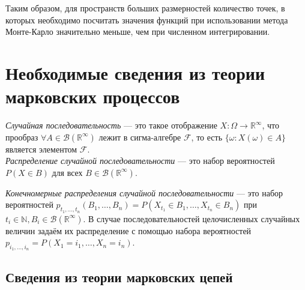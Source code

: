 \documentclass[14pt,a4paper]{article}
\begin{document}
Таким образом, для пространств больших размерностей количество точек, в которых необходимо посчитать значения функций при использовании метода Монте-Карло значительно меньше, чем при численном интегрировании.


\newpage
   \section{Необходимые сведения из теории марковских процессов}
 \textit{Случайная последовательность} --- это такое отображение $X: \Omega \rightarrow \mathbb{R}^\infty$, что прообраз $\forall A \in \mathcal{B}(\mathbb{R}^\infty)$ лежит в сигма-алгебре $\mathcal{F}$, то есть $\{\omega: X(\omega) \in A\}$ является элементом $\mathcal{F}$.\\
 
 \textit{Распределение случайной последовательности} --- это набор вероятностей $P\left(X \in B\right)$ для всех $B \in \mathcal{B}(\mathbb{R}^\infty).$
 
 \textit{Конечномерные распределения случайной последовательности} --- это набор вероятностей $p_{t_1, \dots, t_n}\left(B_1, \dots, B_n \right) = P\left(X_{t_1} \in B_1, \dots, X_{t_n} \in B_n\right)$ при $t_i \in \mathbb{N}, B_i \in \mathcal{B}(\mathbb{R}^\infty).$
  В случае последовательностей целочисленных случайных величин задаём их распределение с помощью набора вероятностей $p_{i_1, \dots, i_n} = P(X_1 = i_1, \dots, X_n = i_n)$. 
  
   \subsection{Сведения из теории марковских цепей}
   
\end{document}
